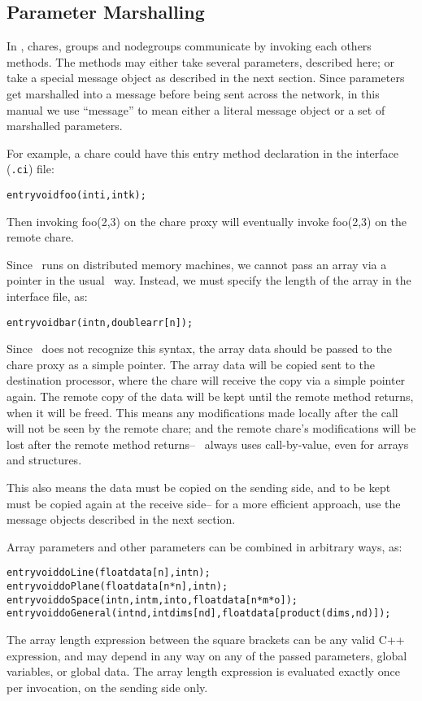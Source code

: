\subsection{Parameter Marshalling}
	
In \charmpp, chares, groups and 
nodegroups communicate by invoking each others methods. 
The methods may either take several parameters, described here; 
or take a special message object as described in the next section.
Since parameters get marshalled into a message before being
sent across the network, in this manual we use ``message''
to mean either a literal message object or a set of marshalled
parameters.

For example, a chare could have this entry method declaration in 
the interface ({\tt .ci}) file:
\begin{alltt}
  entry void foo(int i,int k);
\end{alltt}
Then invoking foo(2,3) on the chare proxy will eventually
invoke foo(2,3) on the remote chare.

Since \charmpp\ runs on distributed memory machines, we cannot
pass an array via a pointer in the usual \CC\ way.  Instead,
we must specify the length of the array in the interface file, as:
\begin{alltt}
  entry void bar(int n,double arr[n]);
\end{alltt}
Since \CC\ does not recognize this syntax, the array data
should be passed to the chare proxy as a simple pointer.
The array data will be copied sent to the
destination processor, where the chare will receive the copy
via a simple pointer again.  The remote copy of the data
will be kept until the remote method returns, when
it will be freed.  
This means any modifications made locally after the call will not be 
seen by the remote chare; and the remote chare's modifications
will be lost after the remote method returns-- \charmpp\ always 
uses call-by-value, even for arrays and structures.  

This also means the data must be copied on the sending 
side, and to be kept must be copied again 
at the receive side-- for a more efficient approach,
use the message objects described in the next section.

Array parameters and other parameters can be combined in arbitrary ways, as:
\begin{alltt}
  entry void doLine(float data[n],int n);
  entry void doPlane(float data[n*n],int n);
  entry void doSpace(int n,int m,int o,float data[n*m*o]);
  entry void doGeneral(int nd,int dims[nd],float data[product(dims,nd)]);
\end{alltt}
The array length expression between the square brackets can be 
any valid C++ expression, and may depend in any way on any of the passed
parameters, global variables, or global data.  The array length expression
is evaluated exactly once per invocation, on the sending side only.

